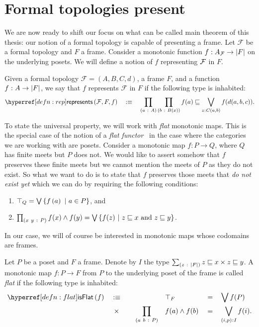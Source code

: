 \section{Formal topologies present}\label{sec:universal-prop}

 We are now ready to shift our focus on what can be
called main theorem of this thesis: our notion of a formal topology is capable of
presenting a frame. Let $\mathcal{F}$ be a formal topology and $F$ a frame. Consider a
monotonic function $f : A_{\mathcal{F}} \rightarrow \left| F \right|$ on the underlying posets. We will
define a notion of $f$ representing $\mathcal{F}{}$ in $F$.

\begin{defn}[Representation]\label{defn:rep}
  Given a formal topology $\mathcal{F} = (A, B, C, d)$, a frame $F$, and a function
  $f\hspace{0.1mm}:\hspace{0.1mm}A \rightarrow \left| F \right|$, we say that $f$ represents $\mathcal{F}$ in $F$ if the
  following type is inhabited:
  \begin{equation*}
    \represents{\mathcal{F}}{F}{f} \quad\is\quad
      \pity{a}{A}{
        \pity{b}{B(x)}{
          f(a) \sqsubseteq \bigvee_{\oftyI{z}{C(a, b)}} f(d(a, b, c)).
        }
      }
  \end{equation*}
\end{defn}

To state the universal property, we will work with \emph{flat} monotonic maps. This is the
special case of the notion of a \emph{flat functor}~\cite{nlab-flat-functor} in the case
where the categories we are working with are posets. Consider a monotonic map $f : P \rightarrow Q$,
where $Q$ has finite meets but $P$ does not. We would like to assert somehow that $f$
preserves these finite meets but we cannot mention the meets of $P$ as they do not
exist. So what we want to do is to state that $f$ preserves those meets that \emph{do not
exist yet} which we can do by requiring the following conditions:
\begin{enumerate}
  \item $\top_Q = \bigvee \left\{  f\left( a \right) ~|~ a \in P  \right\}$, and
  \item $\prod_{(x~y~:~P)} f(x) \wedge f(y) = \bigvee \left\{  f(z) ~|~ z \sqsubseteq x\ \text{and}\ z \sqsubseteq y  \right\}$.
\end{enumerate}
In our case, we will of course be interested in monotonic maps whose codomains are frames.

\begin{defn}\label{defn:flat}
  Let $P$ be a poset and $F$ a frame. Denote by $I$ the type $\sum_{(z~:~\left| F \right|)} z \sqsubseteq x \times
    z \sqsubseteq y$. A monotonic map $f : P \rightarrow F$ from $P$ to the underlying poset of the frame is
  called \emph{flat} if the following type is inhabited:
  \begin{alignat*}{5}
    \isflat{f} \quad&\is\quad && &&\top_F &&= &&\bigvee f(P)\\
      &\hspace{0.4em}\times &&\pity{a~b}{P}{&&f(a) \wedge f(b) &&= &&\bigvee_{\oftyI{(i, p)}{I}} f(i)}.
  \end{alignat*}
\end{defn}

